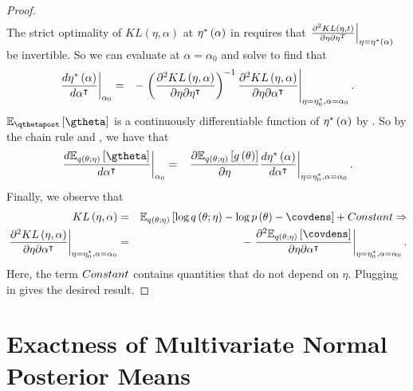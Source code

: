 \documentclass{article}\usepackage[]{graphicx}\usepackage[]{color}
\theoremstyle{definition}
\theoremstyle{plain}
\theoremstyle{plain}
\theoremstyle{plain}
\theoremstyle{definition}
\theoremstyle{plain}
\theoremstyle{plain}
\begin{document}
\begin{proof}
\begin{eqnarray*}
\end{eqnarray*}
The strict optimality of $KL\left(\eta,\alpha\right)$ at
$\eta^{*}\left(\alpha\right)$ in  requires that
$\left.\frac{\partial^{2}KL\left(\eta,t\right)}{\partial\eta\partial\eta^{T}}\right|_{\eta=\eta^{*}\left(\alpha\right)}$
be invertible. So we can evaluate at $\alpha=\alpha_{0}$ and solve to find that
\begin{eqnarray*}
\left.\frac{d\eta^{*}\left(\alpha\right)}{d\alpha^{\intercal}}\right|_{\alpha_{0}} & = &
    -\left.\left(\frac{\partial^{2}KL\left(\eta,\alpha\right)}
    {\partial\eta\partial\eta^{\intercal}}\right)^{-1}
    \frac{\partial^{2}KL\left(\eta,\alpha\right)}
    {\partial\eta\partial\alpha^{\intercal}}\right|_{\eta=\eta_{0}^{*},\alpha=\alpha_{0}}.
\end{eqnarray*}
$\mbe_{\qthetapost}\left[\gtheta\right]$ is a continuously differentiable
function of $\eta^{*}\left(\alpha\right)$ by . So by the
chain rule and , we have that
\begin{eqnarray*}
\left.\frac{d\mbe_{q\left(\theta;\eta\right)}
    \left[\gtheta\right]}{d\alpha^{\trans}}\right|_{\alpha_{0}} & = &
    \left.\frac{\partial\mbe_{q\left(\theta;\eta\right)}
    \left[g\left(\theta\right)\right]}{\partial\eta}\frac{d\etatopt}{d\alpha^{\trans}}
    \right|_{\eta=\etaoptzero,\alpha=\alpha_{0}}.
\end{eqnarray*}
Finally, we observe that
\begin{eqnarray*}
KL\left(\eta,\alpha\right) & = &
    \mbe_{q\left(\theta;\eta\right)}\left[
    \log q\left(\theta;\eta\right)-\log p\left(\theta\right) -
    \covdens\right]+\constant\Rightarrow\\
\left.\frac{\partial^{2}KL\left(\eta,\alpha\right)}
    {\partial\eta\partial\alpha^{\trans}}
    \right|_{\eta=\etaoptzero,\alpha=\alpha_{0}} & = &
-\left.\frac{\partial^{2}\mbe_{q\left(\theta;\eta\right)}
    \left[\covdens\right]}{\partial\eta\partial\alpha^{\trans}}
    \right|_{\eta=\etaoptzero,\alpha=\alpha_{0}}.
\end{eqnarray*}
Here, the term $Constant$ contains quantities that do not depend
on $\eta$. Plugging in gives the desired result.
\end{proof}

\section{Exactness of Multivariate Normal Posterior Means\label{app:mvn_exact}}
\end{document}
